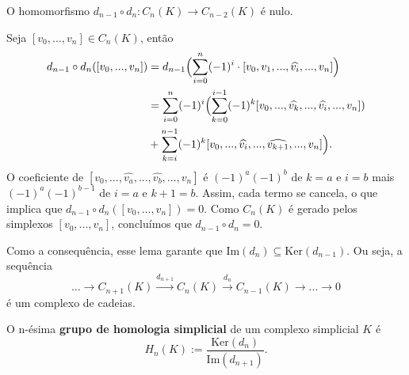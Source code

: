 \begin{lemma}
    O homomorfismo $d_{n-1}\circ d_n:C_n(K)\rightarrow C_{n-2}(K)$ é nulo.
\end{lemma}

\begin{dem}
    Seja $[v_0,...,v_n]\in C_n(K)$, então 
    \begin{align*}
        d_{n-1}\circ d_n ( [v_0,...,v_n])&=d_{n-1}\Bigl(\sum_{i=0}^n (-1)^i \cdot[v_0,v_1,...,\widehat{v_i},...,v_n] \Bigr) \\
        &=\sum_{i=0}^n (-1)^i  \Bigl( \sum_{k=0}^{i-1}(-1)^k[v_0,...,\widehat{v_k},...,\widehat{v_i},...,v_n])\\
        &+\sum_{k=i}^{n-1} (-1)^k[v_0,...,\widehat{v_i},...,\widehat{v_{k+1}},...,v_n]  \Bigr).
    \end{align*}
    O coeficiente de $[v_0,...,\widehat{v_a},...,\widehat{v_b},...,v_n]$ é $(-1)^a(-1)^b$ de $k=a$ e $i=b$ mais $(-1)^a(-1)^{b-1}$ de $i=a$ e $k+1=b$. Assim, cada termo se cancela, o que implica que $d_{n-1}\circ d_n([v_0,...,v_n])=0$. Como $C_n(K)$ é gerado pelos simplexos $[v_0,...,v_n]$, concluímos que $d_{n-1}\circ d_n=0$.
\end{dem}

Como a consequência, esse lema garante que $\text{Im}(d_n)\subseteq \text{Ker}(d_{n-1})$. Ou seja, a sequência 
\[...\rightarrow C_{n+1}(K)\xrightarrow{d_{n+1}}C_n(K)\xrightarrow{d_n} C_{n-1}(K)\rightarrow...\rightarrow 0\]
é um complexo de cadeias.

\begin{defi}
    O n-ésima \textbf{grupo de homologia simplicial} de um complexo simplicial $K$ é 
    \[H_n(K):=\frac{\text{Ker}(d_n)}{\text{Im}(d_{n+1})}.\]
\end{defi}



